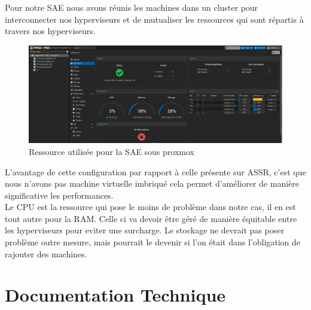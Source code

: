 \documentclass{article}
\begin{document}
Pour notre SAE nous avons réunis les machines dans un cluster pour interconnecter nos hyperviseurs et de mutualiser les ressources qui sont répartis à travers nos hyperviseurs.

\begin{figure}[h]
    \centering
    \includegraphics[width=1\textwidth]{Images/Ressource.png}
    \caption{Ressource utilisée pour la SAE sous proxmox}
    \label{fig:solution1}
\end{figure}

L'avantage de cette configuration par rapport à celle présente sur ASSR, c'est que nous n'avons pas machine virtuelle imbriqué
cela permet d'améliorer de manière significative les performances. \\
Le CPU est la ressource qui pose le moins de problème dans notre cas, il en est tout autre pour la RAM.
Celle ci va devoir être géré de manière équitable entre les hyperviseurs pour eviter une surcharge.
Le stockage ne devrait pas poser problème outre mesure, mais pourrait le devenir si l'on était dans l'obligation de rajouter 
des machines.

\section{Documentation Technique}


\end{document}
